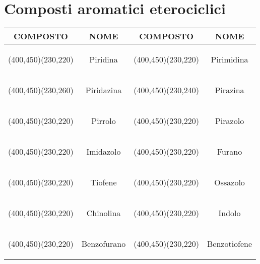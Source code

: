 \section*{Composti aromatici eterociclici}
\begingroup
\begin{table}[H]
	\centering
	\setlength{\tabcolsep}{.5cm}
	\newcommand{\molecola}[5]{\begin{XyMcompd}(#2,#3)(#4,#5){}{}#1{}\end{XyMcompd}}
	\begin{tabular}{cc|cc}
		\toprule
		\textbf{COMPOSTO}                              & \textbf{NOME} &
		\textbf{COMPOSTO}& \textbf{NOME}\\
		\midrule
		\molecola{\pyridinev{}}{400}{450}{230}{220}    & Piridina      &
		\molecola{\pyrimidinevi{}}{400}{450}{230}{220} & Pirimidina    \\
		\molecola{\pyridazinev{}}{400}{450}{230}{260}  & Piridazina    &
		\molecola{\pyrazinev{}}{400}{450}{230}{240}    & Pirazina      \\
		\molecola{\pyrrolev{}}{400}{450}{230}{220}     & Pirrolo       &
		\molecola{\pyrazolev{}}{400}{450}{230}{220}    & Pirazolo      \\
		\molecola{\imidazolev{}}{400}{450}{230}{220}   & Imidazolo     &
		\molecola{\furanv{}}{400}{450}{230}{220}       & Furano        \\
		\molecola{\thiophenev{}}{400}{450}{230}{220}   & Tiofene       &
		\molecola{\oxazolev{}}{400}{450}{230}{220}     & Ossazolo      \\
		\molecola{\quinolinevi{}}{400}{450}{230}{220}  & Chinolina     &
		\molecola{\indolev{}}{400}{450}{230}{220}      & Indolo        \\
		\molecola{\benzofuranev{}}{400}{450}{230}{220} & Benzofurano   &
		\molecola{\nonaheterov[bdfh]{1==S}{}}{400}{450}{230}{220}      & Benzotiofene  \\
		\bottomrule
	\end{tabular}
\end{table}
\endgroup
\newpage